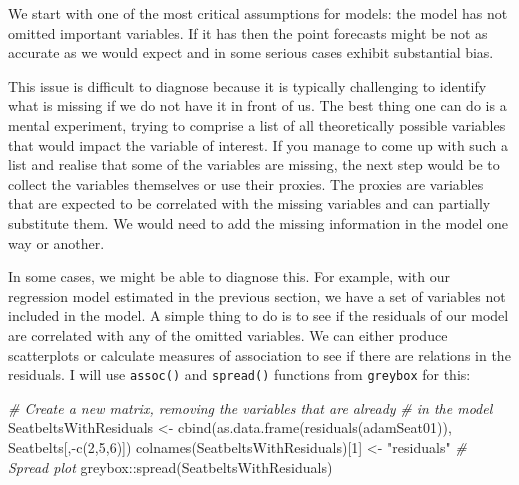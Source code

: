 \documentclass[
]{book}
\newenvironment{Shaded}{\begin{snugshade}}{\end{snugshade}}
\newcommand{\CommentTok}[1]{\textcolor[rgb]{0.56,0.35,0.01}{\textit{#1}}}
\newcommand{\DecValTok}[1]{\textcolor[rgb]{0.00,0.00,0.81}{#1}}
\newcommand{\FunctionTok}[1]{\textcolor[rgb]{0.00,0.00,0.00}{#1}}
\newcommand{\NormalTok}[1]{#1}
\newcommand{\OtherTok}[1]{\textcolor[rgb]{0.56,0.35,0.01}{#1}}
\newcommand{\SpecialCharTok}[1]{\textcolor[rgb]{0.00,0.00,0.00}{#1}}
\newcommand{\StringTok}[1]{\textcolor[rgb]{0.31,0.60,0.02}{#1}}
\theoremstyle{definition}
\theoremstyle{definition}
\theoremstyle{definition}
\theoremstyle{definition}
\theoremstyle{remark}
\begin{document}
We start with one of the most critical assumptions for models: the model has not omitted important variables. If it has then the point forecasts might be not as accurate as we would expect and in some serious cases exhibit substantial bias.

This issue is difficult to diagnose because it is typically challenging to identify what is missing if we do not have it in front of us. The best thing one can do is a mental experiment, trying to comprise a list of all theoretically possible variables that would impact the variable of interest. If you manage to come up with such a list and realise that some of the variables are missing, the next step would be to collect the variables themselves or use their proxies. The proxies are variables that are expected to be correlated with the missing variables and can partially substitute them. We would need to add the missing information in the model one way or another.

In some cases, we might be able to diagnose this. For example, with our regression model estimated in the previous section, we have a set of variables not included in the model. A simple thing to do is to see if the residuals of our model are correlated with any of the omitted variables. We can either produce scatterplots or calculate measures of association \citep[see Section 2.2 and Chapter 6 of][]{SvetunkovSBA} to see if there are relations in the residuals. I will use \texttt{assoc()} and \texttt{spread()} functions from \texttt{greybox} for this:

\begin{Shaded}
\begin{Highlighting}[]
\CommentTok{\# Create a new matrix, removing the variables that are already}
\CommentTok{\# in the model}
\NormalTok{SeatbeltsWithResiduals }\OtherTok{\textless{}{-}}
  \FunctionTok{cbind}\NormalTok{(}\FunctionTok{as.data.frame}\NormalTok{(}\FunctionTok{residuals}\NormalTok{(adamSeat01)),}
\NormalTok{        Seatbelts[,}\SpecialCharTok{{-}}\FunctionTok{c}\NormalTok{(}\DecValTok{2}\NormalTok{,}\DecValTok{5}\NormalTok{,}\DecValTok{6}\NormalTok{)])}
\FunctionTok{colnames}\NormalTok{(SeatbeltsWithResiduals)[}\DecValTok{1}\NormalTok{] }\OtherTok{\textless{}{-}} \StringTok{"residuals"}
\CommentTok{\# Spread plot}
\NormalTok{greybox}\SpecialCharTok{::}\FunctionTok{spread}\NormalTok{(SeatbeltsWithResiduals)}
\end{Highlighting}
\end{Shaded}
\end{document}
